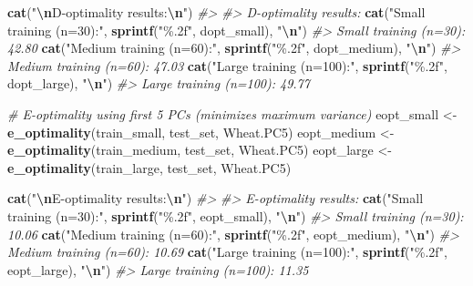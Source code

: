 \documentclass[
]{article}
\newenvironment{Shaded}{\begin{snugshade}}{\end{snugshade}}
\newcommand{\CommentTok}[1]{\textcolor[rgb]{0.56,0.35,0.01}{\textit{#1}}}
\newcommand{\FunctionTok}[1]{\textcolor[rgb]{0.13,0.29,0.53}{\textbf{#1}}}
\newcommand{\NormalTok}[1]{#1}
\newcommand{\OtherTok}[1]{\textcolor[rgb]{0.56,0.35,0.01}{#1}}
\newcommand{\SpecialCharTok}[1]{\textcolor[rgb]{0.81,0.36,0.00}{\textbf{#1}}}
\newcommand{\StringTok}[1]{\textcolor[rgb]{0.31,0.60,0.02}{#1}}
\begin{document}
\begin{Shaded}
\begin{Highlighting}[]
\FunctionTok{cat}\NormalTok{(}\StringTok{"}\SpecialCharTok{\textbackslash{}n}\StringTok{D{-}optimality results:}\SpecialCharTok{\textbackslash{}n}\StringTok{"}\NormalTok{)}
\CommentTok{\#\textgreater{} }
\CommentTok{\#\textgreater{} D{-}optimality results:}
\FunctionTok{cat}\NormalTok{(}\StringTok{"Small training (n=30):"}\NormalTok{, }\FunctionTok{sprintf}\NormalTok{(}\StringTok{"\%.2f"}\NormalTok{, dopt\_small), }\StringTok{"}\SpecialCharTok{\textbackslash{}n}\StringTok{"}\NormalTok{)}
\CommentTok{\#\textgreater{} Small training (n=30): 42.80}
\FunctionTok{cat}\NormalTok{(}\StringTok{"Medium training (n=60):"}\NormalTok{, }\FunctionTok{sprintf}\NormalTok{(}\StringTok{"\%.2f"}\NormalTok{, dopt\_medium), }\StringTok{"}\SpecialCharTok{\textbackslash{}n}\StringTok{"}\NormalTok{)}
\CommentTok{\#\textgreater{} Medium training (n=60): 47.03}
\FunctionTok{cat}\NormalTok{(}\StringTok{"Large training (n=100):"}\NormalTok{, }\FunctionTok{sprintf}\NormalTok{(}\StringTok{"\%.2f"}\NormalTok{, dopt\_large), }\StringTok{"}\SpecialCharTok{\textbackslash{}n}\StringTok{"}\NormalTok{)}
\CommentTok{\#\textgreater{} Large training (n=100): 49.77}

\CommentTok{\# E{-}optimality using first 5 PCs (minimizes maximum variance)}
\NormalTok{eopt\_small }\OtherTok{\textless{}{-}} \FunctionTok{e\_optimality}\NormalTok{(train\_small, test\_set, Wheat.PC5)}
\NormalTok{eopt\_medium }\OtherTok{\textless{}{-}} \FunctionTok{e\_optimality}\NormalTok{(train\_medium, test\_set, Wheat.PC5)}
\NormalTok{eopt\_large }\OtherTok{\textless{}{-}} \FunctionTok{e\_optimality}\NormalTok{(train\_large, test\_set, Wheat.PC5)}

\FunctionTok{cat}\NormalTok{(}\StringTok{"}\SpecialCharTok{\textbackslash{}n}\StringTok{E{-}optimality results:}\SpecialCharTok{\textbackslash{}n}\StringTok{"}\NormalTok{)}
\CommentTok{\#\textgreater{} }
\CommentTok{\#\textgreater{} E{-}optimality results:}
\FunctionTok{cat}\NormalTok{(}\StringTok{"Small training (n=30):"}\NormalTok{, }\FunctionTok{sprintf}\NormalTok{(}\StringTok{"\%.2f"}\NormalTok{, eopt\_small), }\StringTok{"}\SpecialCharTok{\textbackslash{}n}\StringTok{"}\NormalTok{)}
\CommentTok{\#\textgreater{} Small training (n=30): 10.06}
\FunctionTok{cat}\NormalTok{(}\StringTok{"Medium training (n=60):"}\NormalTok{, }\FunctionTok{sprintf}\NormalTok{(}\StringTok{"\%.2f"}\NormalTok{, eopt\_medium), }\StringTok{"}\SpecialCharTok{\textbackslash{}n}\StringTok{"}\NormalTok{)}
\CommentTok{\#\textgreater{} Medium training (n=60): 10.69}
\FunctionTok{cat}\NormalTok{(}\StringTok{"Large training (n=100):"}\NormalTok{, }\FunctionTok{sprintf}\NormalTok{(}\StringTok{"\%.2f"}\NormalTok{, eopt\_large), }\StringTok{"}\SpecialCharTok{\textbackslash{}n}\StringTok{"}\NormalTok{)}
\CommentTok{\#\textgreater{} Large training (n=100): 11.35}
\end{Highlighting}
\end{Shaded}
\end{document}
